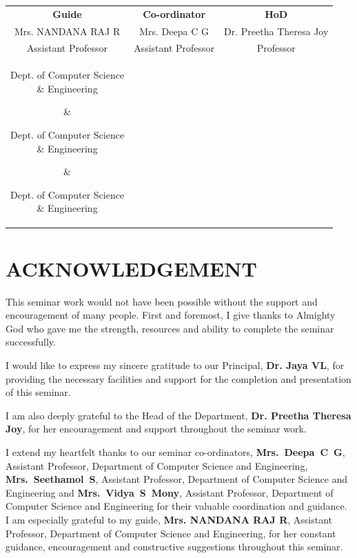 \documentclass[12pt,a4paper]{report}
\newcommand{\guidename}{Mrs. NANDANA RAJ R}
\newcommand{\coordinator}{Mrs. Deepa C G}
\newcommand{\hodname}{Dr. Preetha Theresa Joy}
\newcommand{\principalname}{Dr. Jaya VL}
\begin{document}
\vspace{3.75cm}
\begin{center}
\begin{tabular}{@{}c@{\hspace{0.4cm}}c@{\hspace{0.4cm}}c@{}}
\textbf{Guide} & \textbf{Co-ordinator} & \textbf{HoD}\\[1.6cm]

\guidename & \coordinator & \hodname\\[0.15cm]

Assistant Professor & Assistant Professor & Professor\\[0.15cm]

\parbox[t]{5cm}{\centering Dept. of Computer Science\\\& Engineering} &
\parbox[t]{5cm}{\centering Dept. of Computer Science\\\& Engineering} &
\parbox[t]{5cm}{\centering Dept. of Computer Science\\\& Engineering}

\end{tabular}
\end{center}

\newpage


\setcounter{page}{1}

\chapter*{ACKNOWLEDGEMENT}
This seminar work would not have been possible without the support and encouragement of many people. First and foremost, I give thanks to Almighty God who gave me the strength, resources and ability to complete the seminar successfully.

I would like to express my sincere gratitude to our Principal, \textbf{\principalname}, for providing the necessary facilities and support for the completion and presentation of this seminar.

I am also deeply grateful to the Head of the Department, \textbf{\hodname}, for her encouragement and support throughout the seminar work.

I extend my heartfelt thanks to our seminar co-ordinators, \textbf{Mrs.~Deepa~C~G}, Assistant Professor, Department of Computer Science and Engineering, \textbf{Mrs.~Seethamol~S}, Assistant Professor, Department of Computer Science and Engineering and \textbf{Mrs.~Vidya~S~Mony}, Assistant Professor, Department of Computer Science and Engineering for their valuable coordination and guidance. I am especially grateful to my guide, \textbf{\guidename}, Assistant Professor, Department of Computer Science and Engineering, for her constant guidance, encouragement and constructive suggestions throughout this seminar.
\end{document}
